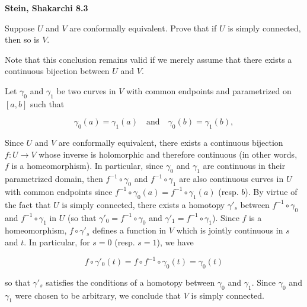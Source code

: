 \textbf{Stein, Shakarchi 8.3}

Suppose $U$ and $V$ are conformally equivalent. Prove that if $U$ is simply connected, then so is $V$.

Note that this conclusion remains valid if we merely assume that there exists a continuous bijection between $U$ and 
$V$.

\begin{solution}
 





 
  
  Let $\gamma_0$ and $\gamma_1$ be two curves in $V$ with common endpoints and parametrized on $[a, b]$ such that

  $$
  \gamma_0(a) = \gamma_1(a) \quad \text{and} \quad \gamma_0(b) = \gamma_1(b),
  $$

  Since $U$ and $V$ are conformally equivalent, there exists a continuous bijection $f: U \to V$ whose inverse is 
  holomorphic and therefore continuous (in other words, $f$ is a homeomorphism). In particular, since $\gamma_0$ and 
  $\gamma_1$ are continuous in their parametrized domain, then $f^{-1} \circ \gamma_0$ and $f^{-1} \circ \gamma_1$ are 
  also continuous curves in $U$ with common endpoints since $f^{-1} \circ \gamma_0(a) = f^{-1} \circ \gamma_1(a)$ 
  (resp. $b$). By virtue of the fact that $U$ is simply connected, there exists a homotopy $\gamma'_s$ between 
  $f^{-1} \circ \gamma_0$ and $f^{-1} \circ \gamma_1$ in $U$ (so that $\gamma'_0 = f^{-1} \circ \gamma_0$ and 
  $\gamma'_1 = f^{-1} \circ \gamma_1$). Since $f$ is a homeomorphism, $f \circ \gamma'_s$ defines a function in $V$ 
  which is jointly continuous in $s$ and $t$. In particular, for $s = 0$ (resp. $s = 1$), we have
 
  $$
  f \circ \gamma'_0(t) = f \circ f^{-1} \circ \gamma_0(t) = \gamma_0(t)
  $$
  
  
  so that $\gamma'_s$ satisfies the conditions of a homotopy between $\gamma_0$ and $\gamma_1$. Since $\gamma_0$ and 
  $\gamma_1$ were chosen to be arbitrary, we conclude that $V$ is simply connected.
  \ \\
\end{solution}
